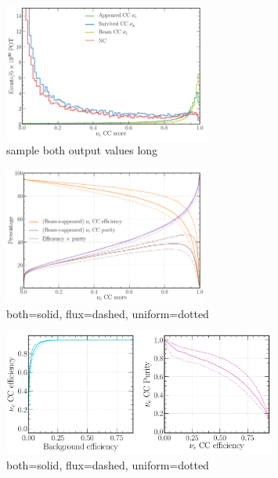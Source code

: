 \begin{figure} %
    \includegraphics[width=0.6\textwidth]{diagrams/7-cvn/chipsnet/sample_both_output_values.pdf}
    \caption[sample both output values short]
    {sample both output values long}
    \label{fig:sample_both_output_values}
\end{figure}

\begin{figure} %
    \includegraphics[width=0.6\textwidth]{diagrams/7-cvn/chipsnet/sample_nuel_eff_curves.pdf}
    \caption[sample nuel eff curves short]
    {both=solid, flux=dashed, uniform=dotted}
    \label{fig:sample_nuel_eff_curves}
\end{figure}

\begin{figure} %
    \includegraphics[width=0.8\textwidth]{diagrams/7-cvn/chipsnet/sample_nuel_comp_curves.pdf}
    \caption[sample nuel comp curves short]
    {both=solid, flux=dashed, uniform=dotted}
    \label{fig:sample_nuel_comp_curves}
\end{figure}

